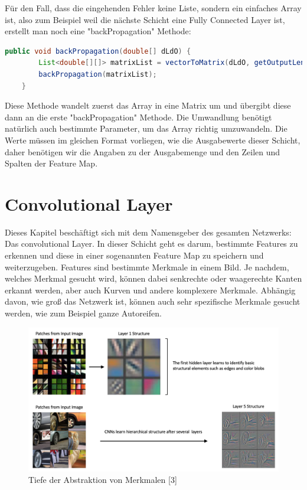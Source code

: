 \documentclass[12pt]{article}
\begin{document}
Für den Fall, dass die eingehenden Fehler keine Liste, sondern ein einfaches Array ist, also zum Beispiel weil die nächste Schicht eine Fully Connected Layer ist, erstellt man noch eine "backPropagation" Methode:

\begin{lstlisting}[language=Java]
    public void backPropagation(double[] dLdO) {
        List<double[][]> matrixList = vectorToMatrix(dLdO, getOutputLength(), getOutputRows(), getOutputCols());
        backPropagation(matrixList);
    }
\end{lstlisting}
Diese Methode wandelt zuerst das Array in eine Matrix um und übergibt diese dann an die erste "backPropagation" Methode. Die Umwandlung benötigt natürlich auch bestimmte Parameter, um das Array richtig umzuwandeln. Die Werte müssen im gleichen Format vorliegen, wie die Ausgabewerte dieser Schicht, daher benötigen wir die Angaben zu der Ausgabemenge und den Zeilen und Spalten der Feature Map.

\cleardoublepage
\section{Convolutional Layer}
Dieses Kapitel beschäftigt sich mit dem Namensgeber des gesamten Netzwerks: Das convolutional Layer. 
In dieser Schicht geht es darum, bestimmte Features zu erkennen und diese in einer sogenannten Feature Map zu speichern und weiterzugeben. Features sind bestimmte Merkmale in einem Bild. Je nachdem, welches Merkmal gesucht wird, können dabei senkrechte oder waagerechte Kanten erkannt werden, aber auch Kurven und andere komplexere Merkmale. Abhängig davon, wie groß das Netzwerk ist, können auch sehr spezifische Merkmale gesucht werden, wie zum Beispiel ganze Autoreifen. 

\begin{figure}[H]
\centering
\includegraphics[scale=0.27]{./Images/003_tensorflow-keras-cnn-hierarchical-structure.png}
\caption{Tiefe der Abstraktion von Merkmalen [3]}
\label{Tiefe der Abstraktion von Merkmalen [3]}
\end{figure}
\end{document}
